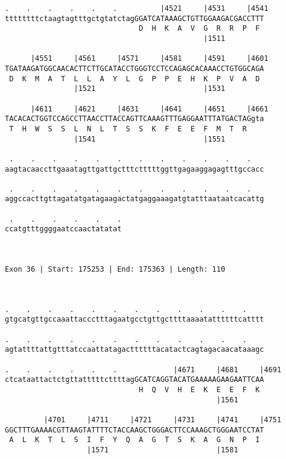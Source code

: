 \documentclass{article}
\begin{document}
\begin{Verbatim}
.    .    .    .    .    .          |4521     |4531     |4541
ttttttttctaagtagtttgctgtatctagGGATCATAAAGCTGTTGGAAGACGACCTTT
                               D  H  K  A  V  G  R  R  P  F 
                                              |1511         
  
      |4551     |4561     |4571     |4581     |4591     |4601
TGATAAGATGGCAACACTTCTTGCATACCTGGGTCCTCCAGAGCACAAACCTGTGGCAGA
 D  K  M  A  T  L  L  A  Y  L  G  P  P  E  H  K  P  V  A  D 
                |1521                         |1531         
  
      |4611     |4621     |4631     |4641     |4651     |4661
TACACACTGGTCCAGCCTTAACCTTACCAGTTCAAAGTTTGAGGAATTTATGACTAGgta
 T  H  W  S  S  L  N  L  T  S  S  K  F  E  E  F  M  T  R    
                |1541                         |1551         
  
 .    .    .    .    .    .    .    .    .    .    .    .   
aagtacaaccttgaaatagttgattgctttctttttggttgagaaggagagtttgccacc
                                                            
 .    .    .    .    .    .    .    .    .    .    .    .   
aggccacttgttagatatgatagaagactatgaggaaagatgtatttaataatcacattg
                                                            
 .    .    .    .    .    .
ccatgtttggggaatccaactatatat
                           
                           
 
Exon 36 | Start: 175253 | End: 175363 | Length: 110



.    .    .    .    .    .    .    .    .    .    .    .    
gtgcatgttgccaaattaccctttagaatgcctgttgcttttaaaatattttttcatttt
                                                            
.    .    .    .    .    .    .    .    .    .    .    .    
agtattttattgtttatccaattatagacttttttacatactcagtagacaacataaagc
                                                            
.    .    .    .    .    .             |4671     |4681     |4691
ctcataattactctgttatttttcttttagGCATCAGGTACATGAAAAAGAAGAATTCAA
                               H  Q  V  H  E  K  E  E  F  K 
                                                 |1561      
  
         |4701     |4711     |4721     |4731     |4741     |4751
GGCTTTGAAAACGTTAAGTATTTTCTACCAAGCTGGGACTTCCAAAGCTGGGAATCCTAT
 A  L  K  T  L  S  I  F  Y  Q  A  G  T  S  K  A  G  N  P  I 
                   |1571                         |1581      
  

\end{Verbatim}
\end{document}
